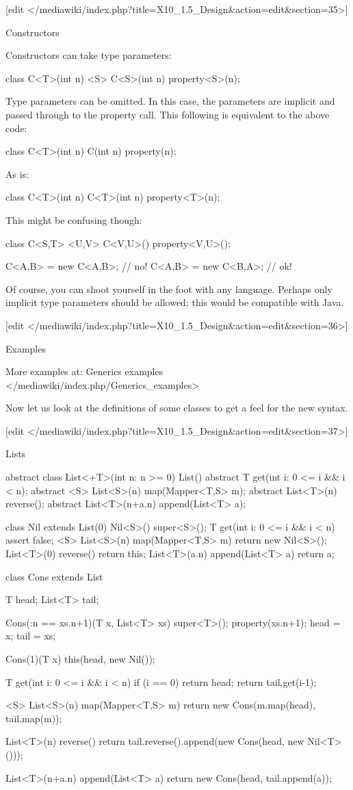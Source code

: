 [edit </mediawiki/index.php?title=X10_1.5_Design&action=edit&section=35>]


    Constructors

Constructors can take type parameters:

class C<T>(int n) {
   <S> C<S>(int n) {
       property<S>(n);
   }
}

Type parameters can be omitted. In this case, the parameters are
implicit and passed through to the property call. This following is
equivalent to the above code:

class C<T>(int n) {
   C(int n) {
       property(n);
   }
}

As is:

class C<T>(int n) {
   C<T>(int n) {
       property<T>(n);
   }
}

This might be confusing though:

class C<S,T> {
   <U,V> C<V,U>() {
      property<V,U>();
   }
}

C<A,B> = new C<A,B>; // no!
C<A,B> = new C<B,A>; // ok!

Of course, you can shoot yourself in the foot with any language. Perhaps
only implicit type parameters should be allowed; this would be
compatible with Java.


[edit </mediawiki/index.php?title=X10_1.5_Design&action=edit&section=36>]


    Examples

More examples at: Generics examples
</mediawiki/index.php/Generics_examples>

Now let us look at the definitions of some classes to get a feel for the
new syntax.

[edit </mediawiki/index.php?title=X10_1.5_Design&action=edit&section=37>]


      Lists

abstract class List<+T>(int n: n >= 0) {
  List() { }
  abstract T get(int i: 0 <= i && i < n);
  abstract <S> List<S>(n) map(Mapper<T,S> m);
  abstract List<T>(n) reverse();
  abstract List<T>(n+a.n) append(List<T> a);
}

class Nil extends List(0) {
  Nil<S>() { super<S>(); }
  T get(int i: 0 <= i && i < n) { assert false; }
  <S> List<S>(n) map(Mapper<T,S> m) { return new Nil<S>(); }
  List<T>(0) reverse() { return this; }
  List<T>(a.n) append(List<T> a) { return a; }
}

class Cons extends List {
  T head;
  List<T> tail;

  Cons(:n == xs.n+1)(T x, List<T> xs) {
    super<T>();
    property(xs.n+1);
    head = x; tail = xs;
  }

  Cons(1)(T x) {
    this(head, new Nil());
  }

  T get(int i: 0 <= i && i < n) {
    if (i == 0) return head;
    return tail.get(i-1);
  }
 
  <S> List<S>(n) map(Mapper<T,S> m) {
    return new Cons(m.map(head), tail.map(m));
  }

  List<T>(n) reverse() {
    return tail.reverse().append(new Cons(head, new Nil<T>()));
  }
  
  List<T>(n+a.n) append(List<T> a) {
    return new Cons(head, tail.append(a));
  }
}

